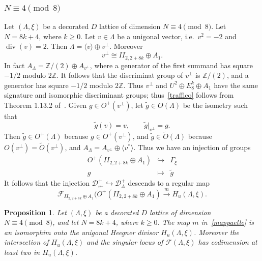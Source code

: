 \documentclass[11pt]{amsart}
\numberwithin{equation}{subsection}
\theoremstyle{plain}
\newtheorem{proposition}[theorem]{Proposition}
\theoremstyle{remark}
\theoremstyle{definition}
\newcommand{\cD}{{\mathscr D}}
\newcommand{\cF}{{\mathscr F}}
\newcommand{\hra}{\hookrightarrow}
\newcommand{\la}{\langle}
\newcommand{\lra}{\longrightarrow}
\newcommand{\ra}{\rangle}
\newcommand{\wt}{\widetilde}
\newcommand{\ZZ}{{\mathbb Z}}
\DeclareMathOperator{\divisore}{div}
\begin{document}
\subsubsection{$N\equiv 4\pmod{8}$}\label{subsubsec:unigon4}
%
Let $(\Lambda,\xi)$ be a decorated $D$ lattice of dimension $N\equiv 4\pmod{8}$. Let $N=8k+4$, where $k\ge 0$. Let $v\in\Lambda$ be a unigonal vector, i.e.~$v^2=-2$ and $\divisore(v)=2$. Then $\Lambda=\la v\ra\oplus v^{\bot}$. Moreover 
%
\begin{equation}\label{traffico}
%
v^{\bot}\cong   II_{2,2+8k}\oplus A_1.
%
\end{equation}
%
In fact $A_{\Lambda}=\ZZ/(2)\oplus A_{v^{\bot}}$, where  a generator of the first summand has square $-1/2$ modulo $2\ZZ$.  It follows that the discriminat group of $v^{\bot}$ is $\ZZ/(2)$, and a generator has square $-1/2$ modulo $2\ZZ$. Thus  $v^{\bot}$ and  $U^2\oplus E_8^k\oplus A_1$ have  the same signature and isomorphic discriminant groups; thus~\eqref{traffico} follows from  Theorem 1.13.2 of~\cite{nikulin}. 
Given $g\in O^{+}(v^{\bot})$, let $\wt{g}\in O(\Lambda)$ be the isometry such that 
%
\begin{equation}
%
\wt{g}(v)=v,\qquad \wt{g}|_{v^{\bot}}=g.
%
\end{equation}
%
Then $\wt{g}\in O^{+}(\Lambda)$ because $g\in O^{+}(v^{\bot})$, and $\wt{g}\in \wt{O}(\Lambda)$ because $O(v^{\bot})=\wt{O}(v^{\bot})$, and  $A_{\Lambda}=A_{v^{\bot}}\oplus \la v^{*}\ra$. Thus we have an injection of groups
%
\begin{equation}
%
\begin{matrix}
%
 O^{+}( II_{2,2+8k}\oplus A_1) & \hra & \Gamma_{\xi} \\
 g & \mapsto & \wt{g}
%
\end{matrix}
%
\end{equation}
%
It follows that the injection $\cD^{+}_{v^{\bot}}\hra \cD^{+}_{\Lambda}$ descends to a regular map
%
\begin{equation}\label{mappaelle}
%
\cF_{ II_{2,2+8k}\oplus A_1}(O^{+}( II_{2,2+8k}\oplus A_1)\overset{m}{\lra} H_u(\Lambda,\xi). 
%
\end{equation}
%
\begin{proposition}\label{prp:unigcong4}
%
Let $(\Lambda,\xi)$ be a decorated $D$ lattice of dimension $N\equiv 4\pmod{8}$, and  let $N=8k+4$, where $k\ge 0$. 
 The map $m$ in~\eqref{mappaelle} is an isomorphim onto the unigonal Heegner divisor $H_u(\Lambda,\xi)$. Moreover the intersection of $H_u(\Lambda,\xi)$ and the singular locus of $\cF(\Lambda,\xi)$ has codimension at least two in  $H_u(\Lambda,\xi)$. 
%
\end{proposition}
\end{document}
